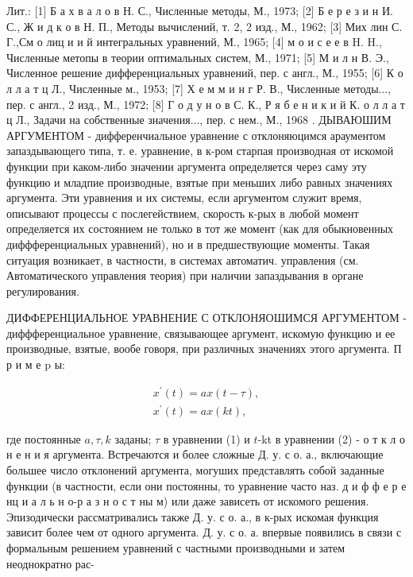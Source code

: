 \documentclass[10pt]{article}
\begin{document}
Лит.: [1] Б а х в а л о в Н. С., Численные методы, М., 1973; [2] Б е р е з и н И. С., Ж и д к о в Н. П., Методы вычислений, т. 2, 2 изд., М., 1962; [3] Мих лин С. Г.,См о лиц и и й интегральных уравнений, М., 1965; [4] м о и с е е в H. H., Численные метопы в теории оптимальных систем, М., 1971; [5] М и л н В. Э., Численное решение дифференциальных уравнений, пер. с англ., М., 1955; [6] К о л л а т ц Л., Численные м., 1953; [7] Х е м м и н г Р. В., Численные методы..., пер. с англ., 2 изд., М., 1972; [8] Г о д у н о в С. К., Р я б е н и к и й К. о л л а т ц Л., Задачи на собственные значения..., пер. с нем., М., 1968 . ДЫВАЮШИМ АРГУМЕНТОМ - дифференчиальное уравнение с отклоняюцимся араументом запаздывающего типа, т. е. уравнение, в к-ром старпая производная от искомой функции при каком-либо значении аргумента определяется через саму эту функцию и младпие производные, взятые при меньших либо равных значениях аргумента. Эти уравнения и их системы, если аргументом служит время, описывают процессы с послегействием, скорость к-рых в любой момент определяется их состоянием не только в тот же момент (как для обыкновенных диффференциальных уравнений), но и в предшествующие моменты. Такая ситуация возникает, в частности, в системах автоматич. управления (см. Автоматического управления теория) при наличии запаздывания в органе регулирования.



ДИФФЕРЕНЦИАЛЬНОЕ УРАВНЕНИЕ С ОТКЛОНЯОШИМСЯ АРГУМЕНТОМ - диффференциальное уравнение, связывающее аргумент, искомую функцию и ее производные, взятые, вообе говоря, при различных значениях этого аргумента. П р и м е $\mathrm{p}$ ы:



\[

\begin{gathered}

x^{\prime}(t)=a x(t-\tau), \\

x^{\prime}(t)=a x(k t),

\end{gathered}

\]



где постоянные $a, \tau, k$ заданы; $\tau$ в уравнении (1) и $t$-kt в уравнении (2) - о т к л о н е н и я аргумента. Встречаются и более сложные Д. у. с о. а., включающие большее число отклонений аргумента, могуших представлять собой заданные функции (в частности, если они постоянны, то уравнение часто наз. д и ф ф е р е нц и а л ь н о-р а з н о с т ны м) или даже зависеть от искомого решения. Эпизодически рассматривались также Д. у. с о. а., в к-рых искомая функция зависит более чем от одного аргумента. Д. у. с о. а. впервые появились в связи с формальным решением уравнений с частными производными и затем неоднократно рас-
\end{document}
